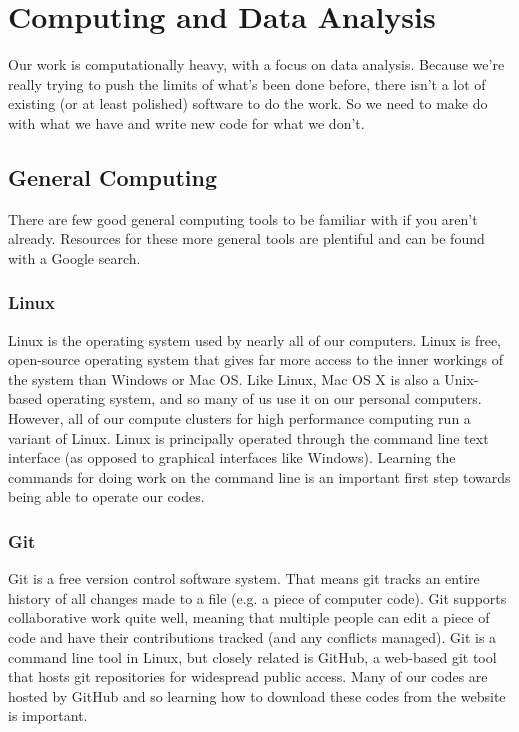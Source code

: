 \chapter{Computing and Data Analysis}
\label{ch3}

Our work is computationally heavy, with a focus on data analysis.  Because we're really trying to push
the limits of what's been done before, there isn't a lot of existing (or at least polished) software to
do the work.  So we need to make do with what we have and write new code for what we don't.

\section{General Computing}

There are few good general computing tools to be familiar with if you aren't already.  Resources for
these more general tools are plentiful and can be found with a Google search.

\subsection{Linux}

Linux is the operating system used by nearly all of our computers.  Linux is free, open-source
operating system that gives far more access to the inner workings of the system than Windows
or Mac OS.  Like Linux, Mac OS X is also a Unix-based operating system, and so many of us
use it on our personal computers.  However, all of our compute clusters for high performance
computing run a variant of Linux.  Linux is principally operated through the command line
text interface (as opposed to graphical interfaces like Windows).  Learning the commands for
doing work on the command line is an important first step towards being able to operate our codes.

\subsection{Git}

Git is a free version control software system.  That means git tracks an entire history of all changes made
to a file (e.g. a piece of computer code).  Git supports collaborative work quite well, meaning
that multiple people can edit a piece of code and have their contributions tracked (and any conflicts
managed).  Git is a command line tool in Linux, but closely related is GitHub, a web-based git
tool that hosts git repositories for widespread public access.  Many of our codes are hosted by GitHub
and so learning how to download these codes from the website is important. 

